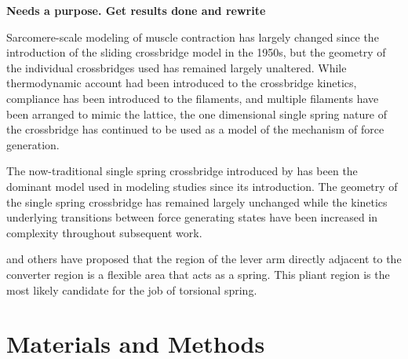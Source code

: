 \documentclass[]{article}
\begin{document}

\textbf{Needs a purpose. Get results done and rewrite}

Sarcomere-scale modeling of muscle contraction has largely changed since the introduction of the sliding crossbridge model in the 1950s, but the geometry of the individual crossbridges used has remained largely unaltered. 
While thermodynamic account had been introduced to the crossbridge kinetics, compliance has been introduced to the filaments, and multiple filaments have been arranged to mimic the lattice, the one dimensional single spring nature of the crossbridge has continued to be used as a model of the mechanism of force generation.

The now-traditional single spring crossbridge introduced by \citet{Huxley:1957:p255} has been the dominant model used in modeling studies since its introduction. 
The geometry of the single spring crossbridge has remained largely unchanged while the kinetics underlying transitions between force generating states have been increased in complexity throughout subsequent work. \citep{Pate:1989:p181, Daniel:1998:p1611, Chase:2004:p204, Tanner:2007:pe115}

\citet{Houdusse:2001:p182} and others have proposed that the region of the lever arm directly adjacent to the converter region is a flexible area that acts as a spring. This pliant region is the most likely candidate for the job of torsional spring. 




\section{Materials and Methods}  %

\end{document}
